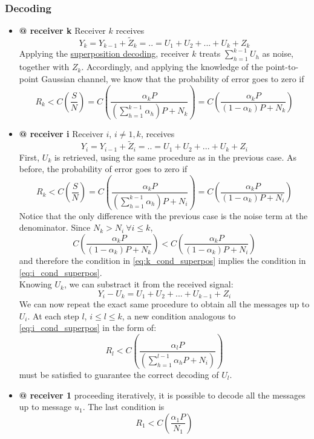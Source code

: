 \subsubsection*{Decoding}
\begin{itemize}
\item \textbf{@ receiver k} Receiver $k$ receives
\begin{equation}
Y_k = Y_{k-1}+\tilde{Z}_k = .. = U_1 + U_2 + ... +U_k + Z_k
\end{equation}
Applying the \underline{superposition decoding}, receiver $k$ treats $\sum_{h=1}^{k-1} U_h$ as noise, together with $Z_k$. Accordingly, and applying the knowledge of the point-to-point Gaussian channel, we know that the probability of error goes to zero if
\begin{equation}
  R_k<C\left(\frac{S}{N}\right) = C\left(\frac{\alpha_k P}{\left(\sum_{h=1}^{k-1}\alpha_h \right)P + N_k}\right) = C\left(\frac{\alpha_k P}{\left(1-\alpha_k\right)P + N_k}\right)
  \label{eq:k_cond_superpos}
\end{equation}
\item \textbf{@ receiver i} Receiver $i$, $i\neq 1,k$, receives
\begin{equation}
Y_i = Y_{i-1}+\tilde{Z}_i = .. = U_1 + U_2 + ... +U_k + Z_i
\end{equation}
First, $U_k$ is retrieved, using the same procedure as in the previous case.
As before, the probability of error goes to zero if
\begin{equation}
  R_k<C\left(\frac{S}{N}\right) = C\left(\frac{\alpha_k P}{\left(\sum_{h=1}^{k-1}\alpha_h \right)P + N_i}\right) = C\left(\frac{\alpha_k P}{\left(1-\alpha_k\right)P + N_i}\right)
  \label{eq:i_cond_superpos}
\end{equation}
Notice that the only difference with the previous case is the noise term at the denominator. Since $N_k>N_i\ \forall i\leq k$,
\begin{equation}
  C\left(\frac{\alpha_k P}{\left(1-\alpha_k\right)P + N_k}\right)<C\left(\frac{\alpha_k P}{\left(1-\alpha_k\right)P + N_i}\right)
\end{equation}
and therefore the condition in \ref{eq:k_cond_superpos} implies the condition in \ref{eq:i_cond_superpos}.\\
Knowing $U_k$, we can substract it from the received signal:
\begin{equation}
Y_i - U_k = U_1 + U_2 + ... +U_{k-1} + Z_i
\end{equation}
We can now repeat the exact same procedure to obtain all the messages up to $U_i$. At each step $l$, $i\leq l \leq k$, a new condition analogous to \ref{eq:i_cond_superpos} in the form of:
\begin{equation}
  R_l< C\left(\frac{\alpha_l P}{\left(\sum_{h=1}^{l-1}\alpha_h P+N_i\right)}\right)
\end{equation}
 must be satisfied to guarantee the correct decoding of $U_l$.
\item \textbf{@ receiver 1} proceeding iteratively, it is possible to decode all the messages up to message $u_1$. The last condition is
\begin{equation}
  R_1<C\left(\frac{\alpha_1 P}{N_1}\right)
\end{equation}
\end{itemize}
